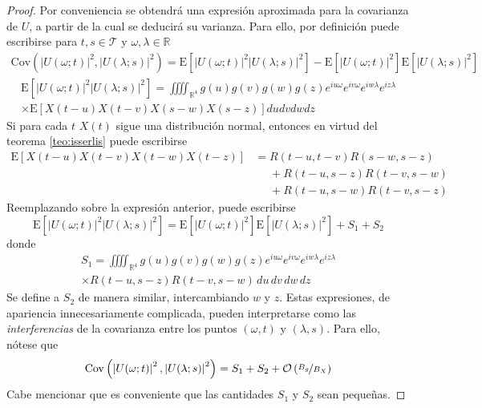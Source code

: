 \documentclass[12pt,letterpaper]{book}
\newcommand{\R}{\mathbb{R}}
\newcommand{\E}[1]{\mathrm{E}\left[ #1 \right]}
\newcommand{\Cov}[1]{\mathrm{Cov}\left( #1 \right)}
\newcommand{\abso}[1]{\left| #1 \right|}
\newcommand{\orden}[1]{\mathcal{O}\left( #1 \right)}
\newcommand{\pheq}{\phantom{=}}
\begin{document}
\begin{proof}
Por conveniencia se obtendrá una expresión aproximada para la covarianza de $U$, a partir de la cual se deducirá su varianza. 
%
Para ello, por definición puede escribirse para $t,s \in \mathcal{T}$ y $\omega, \lambda \in \R$
\begin{align*}
\Cov{\abso{U(\omega;t)}^{2},\abso{U(\lambda;s)}^{2}} =
\E{\abso{U(\omega;t)}^{2} \abso{U(\lambda;s)}^{2}} - 
\E{\abso{U(\omega;t)}^{2}} \E{\abso{U(\lambda;s)}^{2}}
\end{align*}
\begin{multline}
\E{\abso{U(\omega;t)}^{2} \abso{U(\lambda;s)}^{2}}
=
\iiiint_{\R^{4}} g(u) g(v) g(w) g(z) e^{i u \omega} e^{i v \omega} e^{i w \lambda} e^{i z \lambda} \\
 \times
\E{{X(t-u)} {X(t-v)} {X(s-w)} {X(s-z)}}
du dv dw dz 
\end{multline}
Si para cada $t$ $X(t)$ sigue una distribución normal, entonces en virtud del teorema \ref{teo:isserlis} puede escribirse
\begin{align}
\E{X(t-u) {X(t-v)} {X(t-w)} X(t-z)} 
&=       R(t-u,t-v)R(s-w,s-z) \nonumber \\
&\pheq + R(t-u,s-z)R(t-v,s-w) \nonumber \\
&\pheq + R(t-u,s-w)R(t-v,s-z)
\end{align}
Reemplazando sobre la expresión anterior, puede escribirse
\begin{equation}
\E{\abso{U(\omega;t)}^{2} \abso{U(\lambda;s)}^{2}} = \E{\abso{U(\omega;t)}^{2}} \E{\abso{U(\lambda;s)}^{2}}+ S_1 + S_2
\end{equation}
donde
\begin{multline}
S_1 = \iiiint_{\R^{4}} g(u) g(v) g(w) g(z) e^{i u \omega} e^{i v \omega} e^{i w \lambda} e^{i z \lambda} \\
\times
R(t-u,s-z)R(t-v,s-w)\,
du\, dv\, dw\, dz 
\label{lazy_s1}
\end{multline}
Se define a $S_2$ de manera similar, intercambiando $w$ y $z$. 
%
Estas expresiones, de apariencia innecesariamente complicada, pueden interpretarse como las \textit{interferencias} de la covarianza entre los puntos $(\omega, t)$ y $(\lambda,s)$.
%
Para ello, nótese que
\begin{equation}
\Cov{\abso{U(\omega;t)}^{2},\abso{U(\lambda;s)}^{2}} = S_1 + S_2 + \orden{\nicefrac{B_g}{B_X}}
\end{equation}
%
Cabe mencionar que es conveniente que las cantidades $S_1$ y $S_2$ sean pequeñas.


\end{proof}
\end{document}
